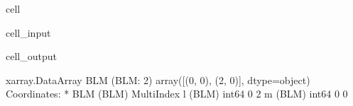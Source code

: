\documentclass[letterpaper,table,10pt,english]{jupyterBook}
\begin{document}
\begin{sphinxuseclass}{cell}\begin{sphinxVerbatimInput}

\begin{sphinxuseclass}{cell_input}
\begin{sphinxVerbatim}[commandchars=\\\{\}]
 
\end{sphinxVerbatim}

\end{sphinxuseclass}\end{sphinxVerbatimInput}
\begin{sphinxVerbatimOutput}

\begin{sphinxuseclass}{cell_output}
\begin{sphinxVerbatim}[commandchars=\\\{\}]
\PYGZlt{}xarray.DataArray \PYGZsq{}BLM\PYGZsq{} (BLM: 2)\PYGZgt{}
array([(0, 0), (2, 0)], dtype=object)
Coordinates:
  * BLM      (BLM) MultiIndex
  \PYGZhy{} l        (BLM) int64 0 2
  \PYGZhy{} m        (BLM) int64 0 0
\end{sphinxVerbatim}

\end{sphinxuseclass}\end{sphinxVerbatimOutput}

\end{sphinxuseclass}
\end{document}

